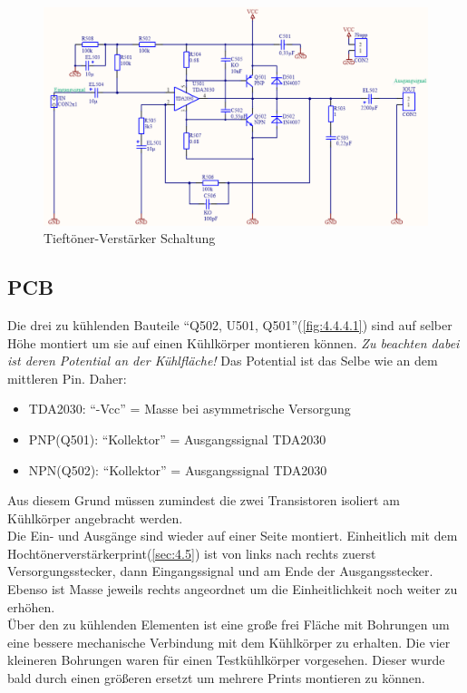 \begin{figure} [H]
	\centering	
	\includegraphics[width=1\textwidth]{img/Print5/5_TTVerstaerker-Schem.PNG}
	\caption{Tieftöner-Verstärker Schaltung}
	\label {fig:4.4.3.1}
\end{figure}

\subsection{PCB}\label{subsec:4.4.4}
Die drei zu kühlenden Bauteile \enquote{Q502, U501, Q501}(\ref{fig:4.4.4.1}) sind auf selber Höhe montiert um sie auf einen Kühlkörper montieren können.
\emph{Zu beachten dabei ist deren Potential an der Kühlfläche!}
Das Potential ist das Selbe wie an dem mittleren Pin.
Daher:
\begin{itemize}
	\item TDA2030: \enquote{-Vcc} = Masse bei asymmetrische Versorgung
	\item PNP(Q501): \enquote{Kollektor} = Ausgangssignal TDA2030
	\item NPN(Q502): \enquote{Kollektor} = Ausgangssignal TDA2030
\end{itemize}

Aus diesem Grund müssen zumindest die zwei Transistoren isoliert am Kühlkörper angebracht werden.\\
Die Ein- und Ausgänge sind wieder auf einer Seite montiert. 
Einheitlich mit dem Hochtönerverstärkerprint(\ref{sec:4.5}) ist von links nach rechts zuerst Versorgungsstecker, dann Eingangssignal und am Ende der Ausgangsstecker.
Ebenso ist Masse jeweils rechts angeordnet um die Einheitlichkeit noch weiter zu erhöhen.\\
Über den zu kühlenden Elementen ist eine große frei Fläche mit Bohrungen um eine bessere mechanische Verbindung mit dem Kühlkörper zu erhalten.
Die vier kleineren Bohrungen waren für einen Testkühlkörper vorgesehen. 
Dieser wurde bald durch einen größeren ersetzt um mehrere Prints montieren zu können.

